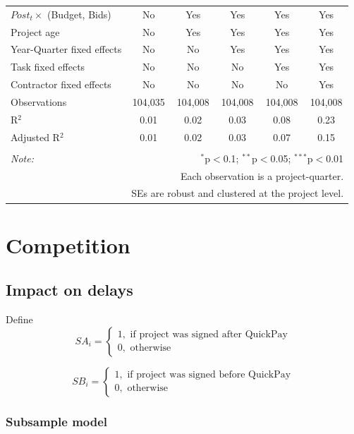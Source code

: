\documentclass[]{article}
\begin{document}
\begin{table}[H]
\begin{tabular}{@{\extracolsep{-2pt}}lccccc}
$Post_t \times $  (Budget, Bids) & No & Yes & Yes & Yes & Yes \\ 
Project age & No & Yes & Yes & Yes & Yes \\ 
Year-Quarter fixed effects & No & No & Yes & Yes & Yes \\ 
Task fixed effects & No & No & No & Yes & Yes \\ 
Contractor fixed effects & No & No & No & No & Yes \\ 
Observations & 104,035 & 104,008 & 104,008 & 104,008 & 104,008 \\ 
R$^{2}$ & 0.01 & 0.02 & 0.03 & 0.08 & 0.23 \\ 
Adjusted R$^{2}$ & 0.01 & 0.02 & 0.03 & 0.07 & 0.15 \\ 
\hline 
\hline \\[-1.8ex] 
\textit{Note:}  & \multicolumn{5}{r}{$^{*}$p$<$0.1; $^{**}$p$<$0.05; $^{***}$p$<$0.01} \\ 
 & \multicolumn{5}{r}{Each observation is a project-quarter.} \\ 
 & \multicolumn{5}{r}{SEs are robust and clustered at the project level.} \\ 
\end{tabular} 
\end{table}

\hypertarget{competition}{%
\section{Competition}\label{competition}}

\hypertarget{impact-on-delays}{%
\subsection{Impact on delays}\label{impact-on-delays}}

Define
\[ SA_i = \begin{cases} 1, \text{ if project was signed after QuickPay}\\
0, \text{ otherwise} \end{cases}\]

\[ SB_i = \begin{cases} 1, \text{ if project was signed before QuickPay}\\
0, \text{ otherwise} \end{cases}\]

\hypertarget{subsample-model}{%
\subsubsection{Subsample model}\label{subsample-model}}
\end{document}
